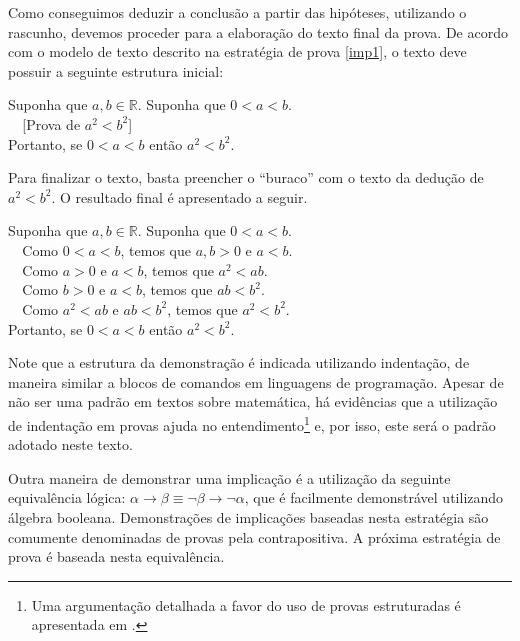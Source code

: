 \begin{Example}
Como conseguimos deduzir a conclusão a partir das hipóteses,
utilizando o rascunho, devemos proceder para a elaboração do texto
final da prova. De acordo com o modelo de texto descrito na estratégia
de prova \ref{imp1}, o texto deve possuir a seguinte estrutura
inicial:
\begin{flushleft}
Suponha que $a,b\in\mathbb{R}$.
Suponha que $0< a < b$.\\
\verb|  |[Prova de $a^2 < b^2$]\\
Portanto, se $0 < a < b$ então $a^2 < b^2$.
\end{flushleft}
Para finalizar o texto, basta preencher o ``buraco'' com o texto da
dedução de $a^2 < b^2$.  O resultado final é apresentado a seguir.
\begin{flushleft}
Suponha que $a,b\in\mathbb{R}$.
Suponha que $0< a < b$.\\
\verb|  |Como $0< a < b$, temos que $a,b > 0$ e $a < b$.\\
\verb|  |Como $a > 0$ e $a < b$, temos que $a^2 < ab$.\\
\verb|  |Como $b > 0$ e $a < b$, temos que $ab < b^2$.\\
\verb|  |Como $a^2 < ab$ e $ab < b^2$, temos que $a^2 < b^2$.\\
Portanto, se $0 < a < b$ então $a^2 < b^2$.
\end{flushleft}
\end{Example}
Note que a estrutura da demonstração é indicada utilizando indentação,
de maneira similar a blocos de comandos em linguagens de
programação. Apesar de não ser uma padrão em textos sobre matemática,
há evidências que a utilização de indentação em provas ajuda no
entendimento\footnote{Uma argumentação detalhada a favor do uso de
  provas estruturadas é apresentada em \cite{Lamport12}.} e, por isso, este será o padrão adotado
neste texto.

Outra maneira de demonstrar uma implicação é a utilização da seguinte
equivalência lógica: $\alpha\to \beta \equiv \neg\beta\to\neg\alpha$,
que é facilmente demonstrável utilizando álgebra booleana.
Demonstrações de implicações baseadas nesta estratégia são comumente
denominadas de provas pela contrapositiva.
A próxima estratégia de prova é baseada nesta equivalência.

